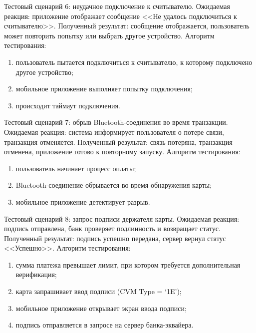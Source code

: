 Тестовый сценарий 6: неудачное подключение к считывателю.
Ожидаемая реакция: приложение отображает сообщение <<Не удалось подключиться к считывателю>>.
Полученный результат: сообщение отображается, пользователь может повторить попытку или выбрать другое устройство.
Алгоритм тестирования:
\begin{enumerate}
	\item пользователь пытается подключиться к считывателю, к которому подключено другое устройство;
	\item мобильное приложение выполняет попытку подключения;
	\item происходит таймаут подключения.
\end{enumerate}

Тестовый сценарий 7: обрыв Bluetooth-соединения во время транзакции.
Ожидаемая реакция: система информирует пользователя о потере связи, транзакция отменяется.
Полученный результат: связь потеряна, транзакция отменена, приложение готово к повторному запуску.
Алгоритм тестирования:
\begin{enumerate}
	\item пользователь начинает процесс оплаты;
	\item Bluetooth-соединение обрывается во время обнаружения карты;
	\item мобильное приложение детектирует разрыв.
\end{enumerate}

Тестовый сценарий 8: запрос подписи держателя карты.
Ожидаемая реакция: подпись отправлена, банк проверяет подлинность и возвращает статус.
Полученный результат: подпись успешно передана, сервер вернул статус <<Успешно>>.
Алгоритм тестирования:
\begin{enumerate}
	\item сумма платежа превышает лимит, при котором требуется дополнительная верификация;
	\item карта запрашивает ввод подписи (CVM Type = ‘1E’);
	\item мобильное приложение открывает экран ввода подписи;
	\item подпись отправляется в запросе на сервер банка-эквайера.
\end{enumerate}

